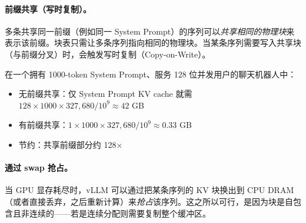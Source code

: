 \paragraph{前缀共享（写时复制）。}
\label{prefix-sharing-copy-on-write.}

多条共享同一前缀（例如同一 System Prompt）的序列可以\emph{共享相同的物理块}来表示该前缀。块表只需让多条序列指向相同的物理块。当某条序列需要写入共享块（与前缀分叉）时，会触发写时复制（Copy-on-Write）。

\begin{intuitionbox}[前缀共享带来的节约]
在一个拥有 1000-token System Prompt、服务 128 位并发用户的聊天机器人中：

\begin{itemize}
  \item 无前缀共享：仅 System Prompt KV cache 就需 $128 \times 1000 \times 327{,}680 / 10^9 \approx 42$ GB
  \item 有前缀共享：$1 \times 1000 \times 327{,}680 / 10^9 \approx 0.33$ GB
  \item 节约：共享前缀部分约 128$\times$
\end{itemize}
\end{intuitionbox}

\paragraph{通过 swap 抢占。}
\label{preemption-via-swap.}

当 GPU 显存耗尽时，vLLM 可以通过把某条序列的 KV 块换出到 CPU DRAM（或者直接丢弃，之后重新计算）来\emph{抢占}该序列。这之所以可行，是因为块是自包含且非连续的——若是连续分配则需要复制整个缓冲区。

